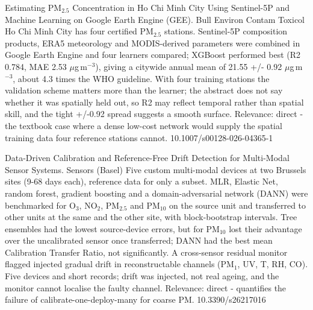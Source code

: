 \documentclass[10pt]{article}
\begin{document}
{Estimating PM$_{2.5}$ Concentration in Ho Chi Minh City Using Sentinel-5P and Machine Learning on Google Earth Engine (GEE).}
{Bull Environ Contam Toxicol}
{Ho Chi Minh City has four certified PM$_{2.5}$ stations. Sentinel-5P composition products, ERA5 meteorology and MODIS-derived parameters were combined in Google Earth Engine and four learners compared; XGBoost performed best (R2 0.784, MAE 2.53 $\mu$g\,m$^{-3}$), giving a citywide annual mean of 21.55 +/- 0.92 $\mu$g\,m$^{-3}$, about 4.3 times the WHO guideline. With four training stations the validation scheme matters more than the learner; the abstract does not say whether it was spatially held out, so R2 may reflect temporal rather than spatial skill, and the tight +/-0.92 spread suggests a smooth surface. Relevance: direct - the textbook case where a dense low-cost network would supply the spatial training data four reference stations cannot.}
{10.1007/s00128-026-04365-1}

\par{}\baselineskip{}\baselineskip
{}

{Data-Driven Calibration and Reference-Free Drift Detection for Multi-Modal Sensor Systems.}
{Sensors (Basel)}
{Five custom multi-modal devices at two Brussels sites (9-68 days each), reference data for only a subset. MLR, Elastic Net, random forest, gradient boosting and a domain-adversarial network (DANN) were benchmarked for O$_3$, NO$_2$, PM$_{2.5}$ and PM$_{10}$ on the source unit and transferred to other units at the same and the other site, with block-bootstrap intervals. Tree ensembles had the lowest source-device errors, but for PM$_{10}$ lost their advantage over the uncalibrated sensor once transferred; DANN had the best mean Calibration Transfer Ratio, not significantly. A cross-sensor residual monitor flagged injected gradual drift in reconstructable channels (PM$_{1}$, UV, T, RH, CO). Five devices and short records; drift was injected, not real ageing, and the monitor cannot localise the faulty channel. Relevance: direct - quantifies the failure of calibrate-one-deploy-many for coarse PM.}
{10.3390/s26217016}
\end{document}
